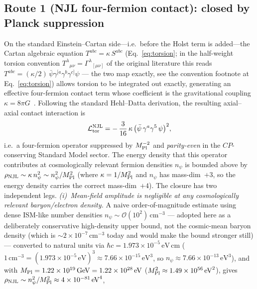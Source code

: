 \documentclass[aps,prd,twocolumn,superscriptaddress,showpacs,preprintnumbers,nofootinbib,longbibliography,floatfix]{revtex4-2}
\newcommand{\MPl}{M_{\rm Pl}}
\begin{document}
\subsection{Route 1 (NJL four-fermion contact): closed by Planck suppression}
\label{sec:r1_njl}
On the standard Einstein--Cartan side---i.e.\ before the Holst term is
added---the Cartan algebraic equation $T^{abc} = \kappa\,S^{abc}$
(Eq.~\eqref{eq:torsion}; in the half-weight torsion convention
$T^\lambda{}_{\mu\nu} = \Gamma^\lambda{}_{[\mu\nu]}$ of the original
literature this reads $T^{abc} = (\kappa/2)\,
\bar\psi \gamma^{[a}\gamma^b\gamma^{c]} \psi$ --- the two map exactly,
see the convention footnote at Eq.~\eqref{eq:torsion}) allows torsion to
be integrated out exactly, generating an effective four-fermion
contact term whose coefficient is the gravitational coupling
$\kappa = 8\pi G$~\cite{Hehl1976,HehlDattaNJL1971}. Following the standard
Hehl--Datta derivation, the resulting axial--axial contact interaction is
\begin{equation}
\mathcal{L}^{\rm NJL}_{\rm tor}
= -\,\frac{3}{16}\,\kappa\,\bigl(\bar\psi\,\gamma^a\gamma^5\,\psi\bigr)^2,
\label{eq:NJL_torsion}
\end{equation}
i.e.\ a four-fermion operator suppressed by $M_{\rm Pl}^{-2}$ and
\emph{parity-even} in the $C\!P$-conserving Standard Model sector. The
energy density that this operator contributes at cosmologically relevant
fermion densities $n_\psi$ is bounded above by
$\rho_{\rm NJL} \sim \kappa\,n_\psi^2 \sim n_\psi^2/M_{\rm Pl}^2$ (where
$\kappa = 1/M_{\rm Pl}^2$ and $n_\psi$ has mass-dim~$+3$, so the energy
density carries the correct mass-dim~$+4$).
The closure has two independent legs. \emph{(i)~Mean-field amplitude is
negligible at any cosmologically relevant baryon/electron density.}
A naive order-of-magnitude estimate using dense ISM-like number
densities $n_\psi\sim\mathcal{O}(10^2)\,\text{cm}^{-3}$ --- adopted here
as a deliberately conservative high-density upper bound, not the
cosmic-mean baryon density (which is $\sim\!2\times 10^{-7}\,\text{cm}^{-3}$
today and would make the bound stronger still) --- converted to
natural units via $\hbar c = 1.973\times 10^{-5}\,\text{eV}\,\text{cm}$
($1\,\text{cm}^{-3} = (1.973\times 10^{-5}\,\text{eV})^3 \approx 7.66\times
10^{-15}\,\text{eV}^3$, so $n_\psi\approx 7.66\times 10^{-13}\,\text{eV}^3$),
and with $\MPl = 1.22\times 10^{19}\,\text{GeV} = 1.22\times 10^{28}\,\text{eV}$
($\MPl^2 \approx 1.49\times 10^{56}\,\text{eV}^2$), gives
$\rho_{\rm NJL} \sim n_\psi^2/\MPl^2 \approx 4\times 10^{-81}\,\text{eV}^4$,
\end{document}
